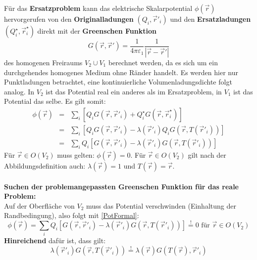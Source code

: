 		  	Für das \textbf{Ersatzproblem} kann das elektrische Skalarpotential $\phi(\vec{r} )$ hervorgerufen von den \textbf{Originalladungen} $(Q_i, \vec{r}' _i)$ und den \textbf{Ersatzladungen} $(Q_i^\star, \vec{r} _i^\star)$ direkt mit der \textbf{Greenschen Funktion}
			        \begin{equation}
				        G(\vec{r} ,\vec{r}' ) = \frac{1}{4\pi\varepsilon_1} \frac{1}{\left|\vec{r}  - \vec{r}'  \right|}
			        \end{equation}
			        des homogenen Freiraums $V_2\cup V_1$ berechnet werden, da es sich um ein durchgehendes homogenes Medium ohne Ränder handelt. Es werden hier nur Punktladungen betrachtet, eine kontinuierliche Volumenladungsdichte folgt analog. In $V_2$ ist das Potential real ein anderes als im Ersatzproblem, in $V_1$ ist das Potential das selbe.  Es gilt somit:
			        \begin{eqnarray} \label{PotFormal}
				        \phi(\vec{r} ) & = &\sum_i \left[ Q_i G(\vec{r} ,\vec{r}' _i) + Q_i^\star G(\vec{r} ,\vec{r} _i^\star)\right]\\
				        & = &  \sum_i \left[ Q_i G(\vec{r} ,\vec{r}' _i) -\lambda(\vec{r}' _i) Q_i G(\vec{r} ,T(\vec{r}' _i))\right]\\
				        & = & \sum_i Q_i \left[G(\vec{r} ,\vec{r}' _i) -\lambda(\vec{r}' _i) G(\vec{r} ,T(\vec{r}' _i))\right]
			        \end{eqnarray}
			   Für $\vec{r}  \in O(V_2)$ muss gelten: $\phi(\vec{r} ) = 0$.
			   Für $\vec{r}  \in O(V_2)$ gilt nach der Abbildungsdefinition auch: $\lambda(\vec{r} ) = 1$ und $T(\vec{r} ) = \vec{r} $.\\\\
	  \textbf{Suchen der problemangepassten Greenschen Funktion für das reale Problem:}\\          
			   Auf der Oberfläche von $V_2$ muss das Potential verschwinden (Einhaltung der Randbedingung), also folgt mit \ref{PotFormal}:
			        \begin{equation}
				        \phi(\vec{r} ) =  \sum_i Q_i \left[G(\vec{r} ,\vec{r}' _i) -\lambda(\vec{r}' _i) G(\vec{r} ,T(\vec{r}' _i))\right] \stackrel{!}{=} 0 \text{ für } \vec{r}  \in O(V_2)
			        \end{equation}
			   \textbf{Hinreichend} dafür ist, dass gilt:
			        \begin{equation}\label{umwaelz}
				        \boxed{\lambda(\vec{r}' _i) G(\vec{r} ,T(\vec{r}' _i)) \stackrel{!}{=}  \lambda(\vec{r} ) G(T(\vec{r} ), \vec{r}' _i)}
			        \end{equation}
